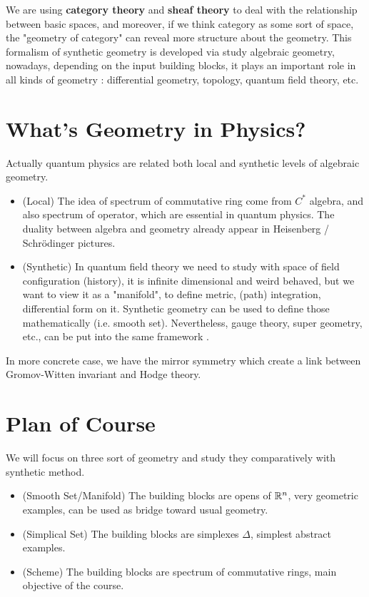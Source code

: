 We are using \textbf{ category theory } and \textbf{ sheaf theory }to deal with the relationship between basic spaces, and moreover, if we think category as some sort of space, the "geometry of category" can reveal more structure about the geometry. This formalism of synthetic geometry is developed via study algebraic geometry, nowadays, depending on the input building blocks, it plays an important role in all kinds of geometry : differential geometry, topology, quantum field theory, etc.


\section{What's Geometry in Physics?}
Actually quantum physics are related both local and synthetic levels of algebraic geometry.
\begin{itemize}
  \item (Local) The idea of spectrum of commutative ring come from $C^*$ algebra, and also spectrum of operator, which are essential in quantum physics. The duality between algebra and geometry already appear in Heisenberg / Schrödinger pictures.
  \item (Synthetic) In quantum field theory we need to study with space of field configuration (history), it is infinite dimensional and weird behaved, but we want to view it as a "manifold", to define metric, (path) integration, differential form on it. Synthetic geometry can be used to define those mathematically (i.e. smooth set). Nevertheless, gauge theory, super geometry, etc., can be put into the same framework \cite{nlab:geometry_of_physics}.
\end{itemize}
In more concrete case, we have the mirror symmetry which create a link between Gromov-Witten invariant and Hodge theory.
\section{Plan of Course}
We will focus on three sort of geometry and study they comparatively with synthetic method. 
\begin{itemize}
  \item (Smooth Set/Manifold) The building blocks are opens of $\mathbb{R}^n$, very geometric examples, can be used as bridge toward usual geometry.
  \item (Simplical Set) The building blocks are simplexes $ \Delta $, simplest abstract examples.
  \item (Scheme) The building blocks are spectrum of commutative rings, main objective of the course.
\end{itemize}
